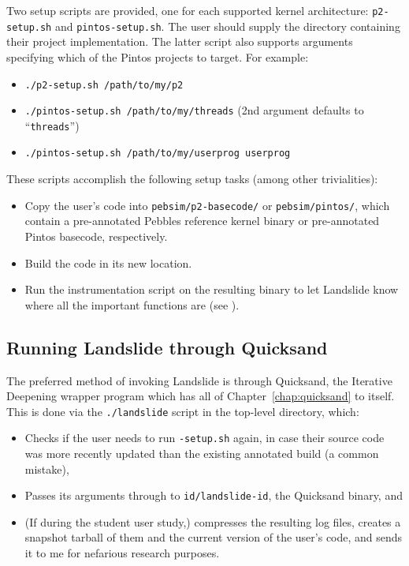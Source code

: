 Two setup scripts are provided, one for each supported kernel architecture: {\tt p2-setup.sh} and {\tt pintos-setup.sh}.
The user should supply the directory containing their project implementation.
The latter script also supports arguments specifying which of the Pintos projects to target.
For example:
\begin{itemize}
	\item {\tt ./p2-setup.sh /path/to/my/p2}
	\item {\tt ./pintos-setup.sh /path/to/my/threads} (2nd argument defaults to ``{\tt threads}'')
	\item {\tt ./pintos-setup.sh /path/to/my/userprog userprog}
\end{itemize}

These scripts accomplish the following setup tasks (among other trivialities):
\begin{itemize}
	\item Copy the user's code into {\tt pebsim/p2-basecode/} or {\tt pebsim/pintos/},
		which contain a pre-annotated Pebbles reference kernel binary or pre-annotated Pintos basecode, respectively.
	\item Build the code in its new location.
	\item Run the instrumentation script on the resulting binary to let Landslide know where all the important functions are
		(see \sect{\ref{sec:landslide-glue}}).
\end{itemize}

\subsection{Running Landslide through Quicksand}
\label{sec:landslide-quicksand-options}

The preferred method of invoking Landslide is through Quicksand, the Iterative Deepening wrapper program which has all of Chapter~\ref{chap:quicksand} to itself.
This is done via the {\tt ./landslide} script in the top-level directory, which:
\begin{itemize}
	\item Checks if the user needs to run {\tt *-setup.sh} again, in case their source code was more recently updated than the existing annotated build (a common mistake),
	\item Passes its arguments through to {\tt id/landslide-id}, the Quicksand binary,
		and
	\item (If during the student user study,) compresses the resulting log files,
		creates a snapshot tarball of them and the current version of the user's code,
		and sends it to me for nefarious research purposes.
\end{itemize}

